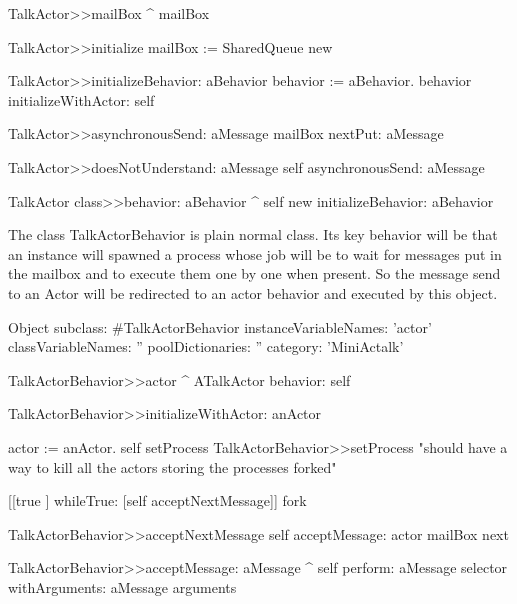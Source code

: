 \documentclass[a4paper,10pt,twoside]{book}
\begin{document}
\begin{method}{}
TalkActor>>mailBox
	^ mailBox
	
TalkActor>>initialize
	mailBox := SharedQueue new
	
TalkActor>>initializeBehavior: aBehavior
	behavior := aBehavior.
	behavior initializeWithActor: self
\end{method}

\begin{method}{}
TalkActor>>asynchronousSend: aMessage
	mailBox nextPut: aMessage

TalkActor>>doesNotUnderstand: aMessage
 	self asynchronousSend: aMessage 
\end{method}

\begin{method}{}
TalkActor class>>behavior: aBehavior
	^ self new initializeBehavior: aBehavior
\end{method}
The class TalkActorBehavior is plain normal class. Its key behavior will be that an instance will spawned a process
whose job will be to wait for messages put in the mailbox and to execute them one by one when present. 
So the message send to an Actor will be redirected to an actor behavior and executed by this object. 

\begin{classdef}{}
Object subclass: #TalkActorBehavior
	instanceVariableNames: 'actor'
	classVariableNames: ''
	poolDictionaries: ''
	category: 'MiniActalk'
\end{classdef}

\begin{method}{}
TalkActorBehavior>>actor
	^ ATalkActor behavior: self
\end{method}

\begin{method}{}
TalkActorBehavior>>initializeWithActor: anActor

	actor := anActor.
	self setProcess
TalkActorBehavior>>setProcess
	"should have a way to kill all the actors storing the processes forked"
	
	[[true ] 
		whileTrue: [self acceptNextMessage]] fork
\end{method}


\begin{method}{}
TalkActorBehavior>>acceptNextMessage
	self acceptMessage: actor mailBox next

TalkActorBehavior>>acceptMessage: aMessage
	^ self perform: aMessage selector withArguments: aMessage arguments
\end{method}
\end{document}
